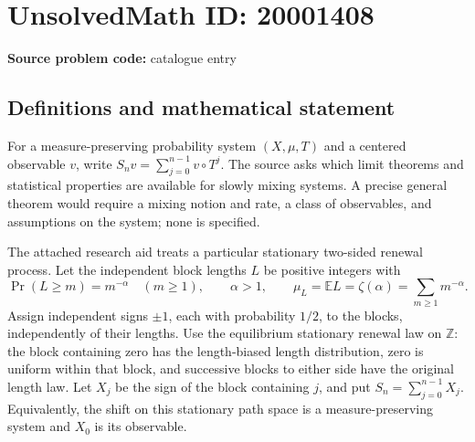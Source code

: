 \documentclass[11pt]{article}
\newcommand{\Z}{\mathbb{Z}}
\newcommand{\E}{\mathbb{E}}
\begin{document}
\section*{UnsolvedMath ID: 20001408}
\textbf{Source problem code:} catalogue entry
\subsection{Definitions and mathematical statement}
For a measure-preserving probability system \((X,\mu,T)\) and a centered observable \(v\), write \(S_n v=\sum_{j=0}^{n-1}v\circ T^j\). The source asks which limit theorems and statistical properties are available for slowly mixing systems. A precise general theorem would require a mixing notion and rate, a class of observables, and assumptions on the system; none is specified.

The attached research aid treats a particular stationary two-sided renewal process. Let the independent block lengths \(L\) be positive integers with
\[
 \Pr(L\ge m)=m^{-\alpha}\quad(m\ge1),\qquad \alpha>1,\qquad
 \mu_L=\E L=\zeta(\alpha)=\sum_{m\ge1}m^{-\alpha}.
\]
Assign independent signs \(\pm1\), each with probability \(1/2\), to the blocks, independently of their lengths. Use the equilibrium stationary renewal law on \(\Z\): the block containing zero has the length-biased length distribution, zero is uniform within that block, and successive blocks to either side have the original length law. Let \(X_j\) be the sign of the block containing \(j\), and put \(S_n=\sum_{j=0}^{n-1}X_j\). Equivalently, the shift on this stationary path space is a measure-preserving system and \(X_0\) is its observable.
\end{document}
